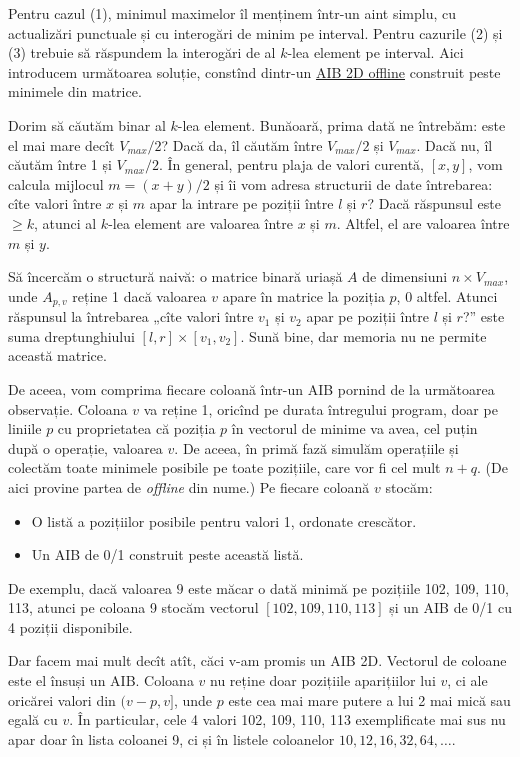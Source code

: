 \documentclass[../main.tex]{subfiles}
\begin{document}
Pentru cazul (1), minimul maximelor îl menținem într-un aint simplu, cu actualizări punctuale și cu interogări de minim pe interval. Pentru cazurile (2) și (3) trebuie să răspundem la interogări de al $k$-lea element pe interval. Aici introducem următoarea soluție, constînd dintr-un \href{https://usaco.guide/plat/2DRQ?lang=cpp#offline-2d-bit}{AIB 2D offline} construit peste minimele din matrice.

Dorim să căutăm binar al $k$-lea element. Bunăoară, prima dată ne întrebăm: este el mai mare decît $V_{max} / 2$? Dacă da, îl căutăm între $V_{max} / 2$ și $V_{max}$. Dacă nu, îl căutăm între 1 și $V_{max} / 2$. În general, pentru plaja de valori curentă, $[x, y]$, vom calcula mijlocul $m = (x + y) / 2$ și îi vom adresa structurii de date întrebarea: cîte valori între $x$ și $m$ apar la intrare pe poziții între $l$ și $r$? Dacă răspunsul este $\geq k$, atunci al $k$-lea element are valoarea între $x$ și $m$. Altfel, el are valoarea între $m$ și $y$.

Să încercăm o structură naivă: o matrice binară uriașă $A$ de dimensiuni $n \times V_{max}$, unde $A_{p,v}$ reține 1 dacă valoarea $v$ apare în matrice la poziția $p$, 0 altfel. Atunci răspunsul la întrebarea „cîte valori între $v_1$ și $v_2$ apar pe poziții între $l$ și $r$?” este suma dreptunghiului $[l, r] \times [v_1, v_2]$. Sună bine, dar memoria nu ne permite această matrice.

De aceea, vom comprima fiecare coloană într-un AIB pornind de la următoarea observație. Coloana $v$ va reține 1, oricînd pe durata întregului program, doar pe liniile $p$ cu proprietatea că poziția $p$ în vectorul de minime va avea, cel puțin după o operație, valoarea $v$. De aceea, în primă fază simulăm operațiile și colectăm toate minimele posibile pe toate pozițiile, care vor fi cel mult $n + q$. (De aici provine partea de \textit{offline} din nume.) Pe fiecare coloană $v$ stocăm:

\begin{itemize}
  \item O listă a pozițiilor posibile pentru valori 1, ordonate crescător.
  \item Un AIB de 0/1 construit peste această listă.
\end{itemize}

De exemplu, dacă valoarea $9$ este măcar o dată minimă pe pozițiile 102, 109, 110, 113, atunci pe coloana 9 stocăm vectorul $[102, 109, 110, 113]$ și un AIB de 0/1 cu 4 poziții disponibile.

Dar facem mai mult decît atît, căci v-am promis un AIB 2D.  Vectorul de coloane este el însuși un AIB. Coloana $v$ nu reține doar pozițiile aparițiilor lui $v$, ci ale oricărei valori din $(v - p, v]$, unde $p$ este cea mai mare putere a lui 2 mai mică sau egală cu $v$. În particular, cele 4 valori 102, 109, 110, 113 exemplificate mai sus nu apar doar în lista coloanei 9, ci și în listele coloanelor $10, 12, 16, 32, 64, \dots$.
\end{document}
